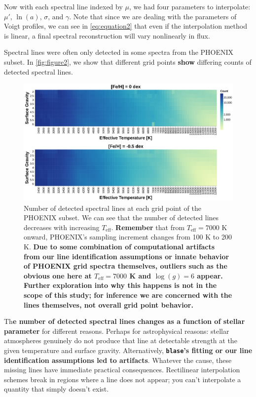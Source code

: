 \documentclass[twocolumn, linenumbers]{aastex631}
\begin{document}
Now with each spectral line indexed by $\mu$, we had four parameters to interpolate: $\mu'$, $\ln(a)$, $\sigma$, and $\gamma$.
Note that since we are dealing with the parameters of Voigt profiles, we can see in \autoref{eq:equation2} that even if the interpolation method is linear, a final spectral reconstruction will vary nonlinearly in flux.

Spectral lines were often only detected in some spectra from the PHOENIX subset.
In \autoref{fig:figure2}, we show that different grid points \textbf{show} differing counts of detected spectral lines.
\begin{figure}
    \centering
    \includegraphics[width=\textwidth]{figure2}
    \caption{Number of detected spectral lines at each grid point of the PHOENIX subset.
    We can see that the number of detected lines decreases with increasing $T_{\mathrm{eff}}$.
    \textbf{Remember} that from $T_{\mathrm{eff}} = 7000$ K onward, PHOENIX's sampling increment changes from 100 K to 200 K.
    \textbf{Due to some combination of computational artifacts from our line identification assumptions or innate behavior of PHOENIX grid spectra themselves, outliers such as the obvious one here at $T_{\mathrm{eff}} = 7000$ K and $\log(g) = 6$ appear.
    Further exploration into why this happens is not in the scope of this study; for inference we are concerned with the lines themselves, not overall grid point behavior.}}
    \label{fig:figure2}
\end{figure}

Th\textbf{e number of detected spectral lines changes as a function of stellar parameter} for different reasons.
Perhaps for astrophysical reasons: stellar atmospheres genuinely do not produce that line at detectable strength at the given temperature and surface gravity.
Alternatively, \textbf{\texttt{blase}'s fitting or our line identification assumptions led to artifacts}.
Whatever the cause, these missing lines have immediate practical consequences.
Rectilinear interpolation schemes break in regions where a line does not appear; you can't interpolate a quantity that simply doesn't exist.
\end{document}
